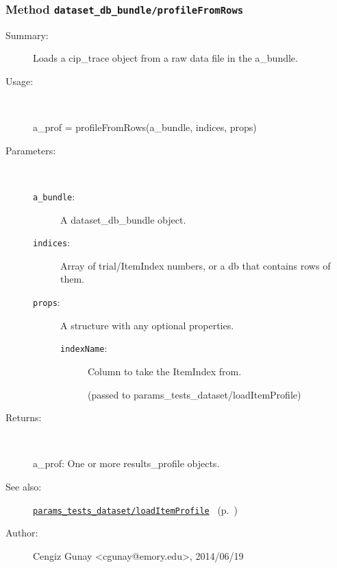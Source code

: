 \subsubsection[Method \texttt{profileFromRows}]{Method \texttt{dataset\_db\_bundle/profileFromRows}}%
%
\label{ref_dataset_db_bundle__profileFromRows}%
\hypertarget{ref_dataset_db_bundle__profileFromRows}{}%
\begin{description}
\item[Summary:]Loads a cip\_trace object from a raw data file in the a\_bundle.
%
\item[Usage:]~%
\begin{lyxcode}%
a\_prof = profileFromRows(a\_bundle, indices, props)
%
\end{lyxcode}%
%
%
\item[Parameters:]~
\begin{description}%
\item[\texttt{a\_bundle}:]
 A dataset\_db\_bundle object.
\item[\texttt{indices}:]
 Array of trial/ItemIndex numbers, or a db that contains rows of them.
\item[\texttt{props}:]
 A structure with any optional properties.
\begin{description}%
\item[\texttt{indexName}:]
 Column to take the ItemIndex from.

(passed to params\_tests\_dataset/loadItemProfile)
\end{description}%
\end{description}%
%
\item[Returns:
]~

   a\_prof: One or more results\_profile objects.
%
%
\item[See also:]%
\hyperlink{ref_params_tests_dataset__loadItemProfile}{\texttt{params\_tests\_dataset/loadItemProfile}}%
\ (p.~\pageref{ref_params_tests_dataset__loadItemProfile})%
%
%
\item[Author:]%
Cengiz Gunay <cgunay@emory.edu>, 2014/06/19
%
\end{description}
\methodline%
